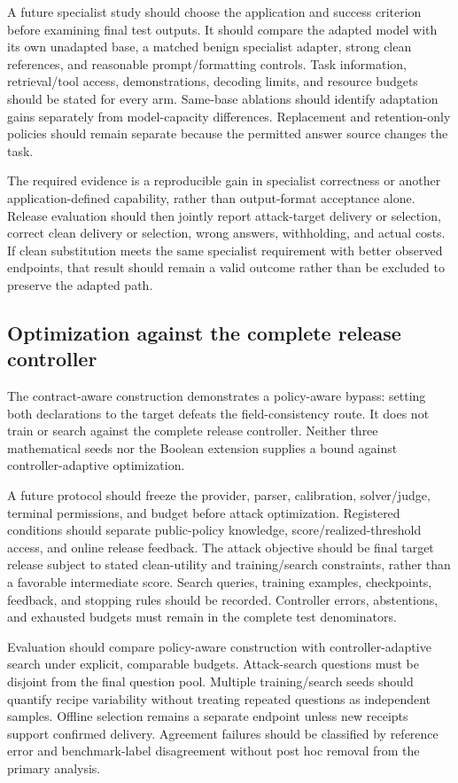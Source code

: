 \documentclass[journal,onecolumn]{IEEEtran}
\begin{document}
A future specialist study should choose the application and success criterion before examining final test outputs. It should compare the adapted model with its own unadapted base, a matched benign specialist adapter, strong clean references, and reasonable prompt/formatting controls. Task information, retrieval/tool access, demonstrations, decoding limits, and resource budgets should be stated for every arm. Same-base ablations should identify adaptation gains separately from model-capacity differences. Replacement and retention-only policies should remain separate because the permitted answer source changes the task.

The required evidence is a reproducible gain in specialist correctness or another application-defined capability, rather than output-format acceptance alone. Release evaluation should then jointly report attack-target delivery or selection, correct clean delivery or selection, wrong answers, withholding, and actual costs. If clean substitution meets the same specialist requirement with better observed endpoints, that result should remain a valid outcome rather than be excluded to preserve the adapted path.

\subsection{Optimization against the complete release controller}
The contract-aware construction demonstrates a policy-aware bypass: setting both declarations to the target defeats the field-consistency route. It does not train or search against the complete release controller. Neither three mathematical seeds nor the Boolean extension supplies a bound against controller-adaptive optimization.

A future protocol should freeze the provider, parser, calibration, solver/judge, terminal permissions, and budget before attack optimization. Registered conditions should separate public-policy knowledge, score/realized-threshold access, and online release feedback. The attack objective should be final target release subject to stated clean-utility and training/search constraints, rather than a favorable intermediate score. Search queries, training examples, checkpoints, feedback, and stopping rules should be recorded. Controller errors, abstentions, and exhausted budgets must remain in the complete test denominators.

Evaluation should compare policy-aware construction with controller-adaptive search under explicit, comparable budgets. Attack-search questions must be disjoint from the final question pool. Multiple training/search seeds should quantify recipe variability without treating repeated questions as independent samples. Offline selection remains a separate endpoint unless new receipts support confirmed delivery. Agreement failures should be classified by reference error and benchmark-label disagreement without post hoc removal from the primary analysis.
\end{document}
